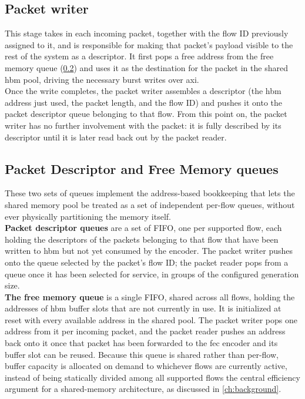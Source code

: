 \subsection{Packet writer}
This stage takes in each incoming packet, together with the flow ID previously assigned to it, 
and is responsible for making that packet's payload visible to the rest of the
system as a descriptor. It first pops a free address from the free memory queue
(\cref{sec:descriptor-and-free-queues}) and uses it as the destination for the packet in the
shared \gls{hbm} pool, driving the necessary burst writes over \gls{axi}. \\

Once the write completes, the packet writer assembles a descriptor (the \gls{hbm} address 
just used, the packet length, and the flow ID) and pushes it onto the packet descriptor queue 
belonging to that flow. From this point on, the packet writer has no further involvement with the packet:
it is fully described by its descriptor until it is later read back out by the packet reader.

\subsection{Packet Descriptor and Free Memory queues}\label{sec:descriptor-and-free-queues}
These two sets of queues implement the address-based bookkeeping that lets the shared
memory pool be treated as a set of independent per-flow queues, without ever physically
partitioning the memory itself. \\

\textbf{Packet descriptor queues} are a set of FIFO, one per supported flow, each
holding the descriptors of the packets belonging to that flow that have been written to
\gls{hbm} but not yet consumed by the encoder. The packet writer pushes onto the queue
selected by the packet's flow ID; the packet reader pops from a queue once it has been
selected for service, in groups of the configured generation size. \\

\textbf{The free memory queue} is a single FIFO, shared across all flows, holding the
addresses of \gls{hbm} buffer slots that are not currently in use. It is initialized at reset
with every available address in the shared pool. The packet writer pops one address from it
per incoming packet, and the packet reader pushes an address back onto it once that packet
has been forwarded to the \gls{fec} encoder and its buffer slot can be reused. Because this
queue is shared rather than per-flow, buffer capacity is allocated on demand to whichever
flows are currently active, instead of being statically divided among all supported flows 
the central efficiency argument for a shared-memory architecture, as discussed in
\cref{ch:background}.

